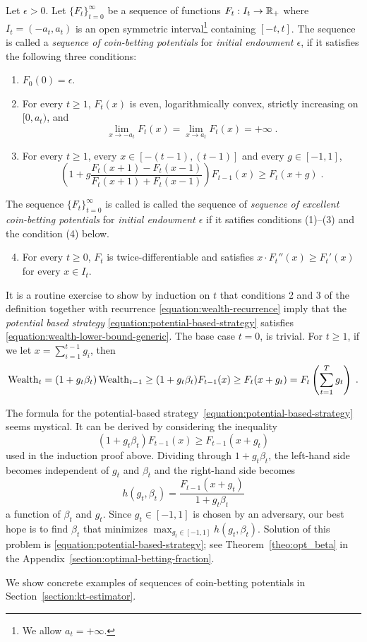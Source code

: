 \begin{definition}
\label{definition:potential}
Let $\epsilon > 0$. Let $\{F_t\}_{t=0}^\infty$ be a sequence of functions
$F_t:I_t  \to \mathbb{R}_+$ where $I_t = (-a_t, a_t)$ is an open symmetric interval\footnote{We allow $a_t = +\infty$.} containing
$[-t,t]$.  The sequence is called a \emph{sequence of coin-betting potentials}
for \emph{initial endowment $\epsilon$}, if it satisfies the following three conditions:
\begin{enumerate}[(1)]
\item $F_0(0) = \epsilon$.

\item For every $t \ge 1$, $F_t(x)$ is even, logarithmically convex, strictly increasing on $[0,a_t)$, and
\begin{equation}
\label{equation:potential-limit-assumption}
\lim_{x \to -a_t} F_t(x) = \lim_{x \to a_t} F_t(x) = +\infty \; .
\end{equation}

\item For every $t \ge 1$, every $x \in [-(t-1), (t-1)]$ and every $g \in [-1,1]$,
$$
\left(1 + g \frac{F_t(x + 1) - F_t(x - 1)}{F_t(x + 1) + F_t(x - 1)} \right) F_{t-1}(x) \ge F_t(x+g) \; .
$$
\end{enumerate}
The sequence $\{F_t\}_{t=0}^\infty$  is called is called the sequence of
\emph{sequence of excellent coin-betting potentials} for \emph{initial endowment
$\epsilon$} if it satifies conditions (1)--(3) and the condition (4) below.
\begin{enumerate}[(1)]
\setcounter{enumi}{3}
\item For every $t \ge 0$, $F_t$ is twice-differentiable and
satisfies $x \cdot F_t''(x) \ge F_t'(x)$ for every $x \in I_t$.
\end{enumerate}
\end{definition}

It is a routine exercise to show by induction on $t$ that conditions 2 and 3
of the definition together with recurrence \eqref{equation:wealth-recurrence}
imply that the \emph{potential based strategy}
\eqref{equation:potential-based-strategy} satisfies
\eqref{equation:wealth-lower-bound-generic}. The base case $t=0$, is trivial.
For $t \ge 1$, if we let $x = \sum_{i=1}^{t-1} g_i$, then
$$
\operatorname{Wealth}_t
= (1+g_t \beta_t) \operatorname{Wealth}_{t-1}
\ge (1 + g_t \beta_t) F_{t-1}(x)
\ge F_t(x + g_t)
= F_t \left( \sum_{t=1}^T g_t \right) \; .
$$

The formula for the potential-based
strategy~\eqref{equation:potential-based-strategy} seems mystical. It
can be derived by considering the inequality
$$
(1+g_t\beta_t) F_{t-1}(x) \ge F_{t-1}(x + g_t)
$$
used in the induction proof above. Dividing through $1+g_t\beta_t$, the left-hand
side becomes independent of $g_t$ and $\beta_t$ and the right-hand side becomes
$$
h(g_t, \beta_t) = \frac{F_{t-1}(x + g_t)}{1 + g_t\beta_t}
$$
a function of $\beta_t$ and $g_t$. Since $g_t \in [-1,1]$ is chosen by an
adversary, our best hope is to find $\beta_t$ that minimizes $\max_{g_t \in
[-1,1]} h(g_t,\beta_t)$. Solution of this problem is \eqref{equation:potential-based-strategy};
see Theorem~\ref{theo:opt_beta} in the Appendix~\ref{section:optimal-betting-fraction}.

We show concrete examples of sequences of coin-betting potentials in
Section~\ref{section:kt-estimator}.
